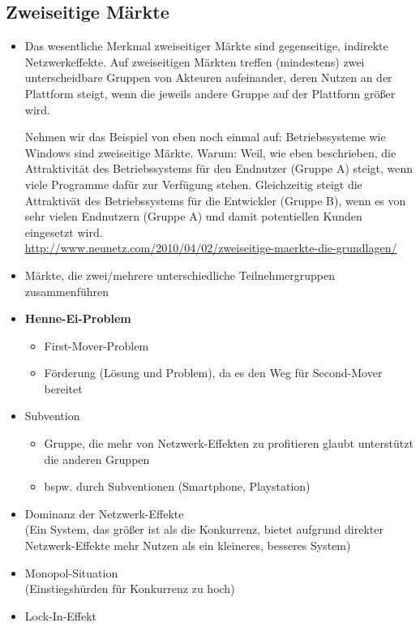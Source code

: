 \documentclass{article} %
\begin{document}
	\subsection{Zweiseitige Märkte}
		\begin{itemize}
		\item Das wesentliche Merkmal zweiseitiger Märkte sind gegenseitige, indirekte Netzwerkeffekte. Auf zweiseitigen Märkten treffen (mindestens) zwei unterscheidbare Gruppen von Akteuren aufeinander, deren Nutzen an der Plattform steigt, wenn die jeweils andere Gruppe auf der Plattform größer wird.
		
Nehmen wir das Beispiel von eben noch einmal auf: Betriebssysteme wie Windows sind zweiseitige Märkte. Warum: Weil, wie eben beschrieben, die Attraktivität des Betriebssystems für den Endnutzer (Gruppe A) steigt, wenn viele Programme dafür zur Verfügung stehen. Gleichzeitig steigt die Attraktivät des Betriebssystems für die Entwickler (Gruppe B), wenn es von sehr vielen Endnutzern (Gruppe A) und damit potentiellen Kunden eingesetzt wird.\\
\url{http://www.neunetz.com/2010/04/02/zweiseitige-maerkte-die-grundlagen/}
			\item Märkte, die zwei/mehrere unterschiedliche Teilnehmergruppen zusammenführen
			\item \glqq \textbf{Henne-Ei-Problem}\grqq
			\begin{itemize}
				\item First-Mover-Problem
				\item Förderung (Lösung und Problem), da es den Weg für Second-Mover bereitet				
			\end{itemize}
			\item Subvention
				\begin{itemize}
					\item Gruppe, die mehr von Netzwerk-Effekten zu profitieren glaubt unterstützt die anderen Gruppen
					\item bspw. durch Subventionen (Smartphone, Playstation)
				\end{itemize}
			\item Dominanz der Netzwerk-Effekte\\
			(Ein System, das größer ist als die Konkurrenz, bietet aufgrund direkter
Netzwerk-Effekte mehr Nutzen als ein kleineres, besseres System)
			\item Monopol-Situation\\
			(Einstiegshürden für Konkurrenz zu hoch)
			\item Lock-In-Effekt\\

\end{itemize}
\end{document}
